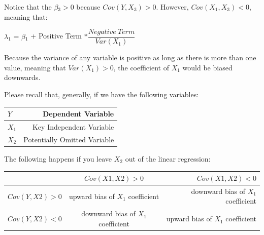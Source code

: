 \documentclass[12pt]{article}\usepackage[]{graphicx}\usepackage[]{color}
\begin{document}
\bigskip

Notice that the $\beta{_3} > 0$ because $Cov(Y, X_3) > 0$. However, $Cov(X_1, X_3) < 0$, meaning that:

\bigskip

$\lambda{_1}$ = $\beta{_1}$ + Positive Term $* \dfrac{Negative \ Term}{Var(X_1)}$

\bigskip

Because the variance of any variable is positive as long as there is more than one value, meaning that $Var(X_1) > 0$, the coefficient of $X_1$ would be biased downwards. 

\bigskip

Please recall that, generally, if we have the following variables:

\begin{center}
  \begin{tabular}{ | l | r | }
    \hline
    $Y$ & Dependent Variable \\ \hline
    $X_1$ & Key Independent Variable \\ \hline
    $X_2$ & Potentially Omitted Variable \\
    \hline
  \end{tabular}
\end{center}

\bigskip

The following happens if you leave $X_2$ out of the linear regression:

\bigskip

\begin{center}
    \begin{tabular}{ | l | c | r |}
    \hline
    & $Cov(X1,X2) > 0$ & $Cov(X1,X2) < 0$ \\ \hline
    $Cov(Y,X2) > 0$ & upward bias of $X_1$ coefficient & downward bias of $X_1$ coefficient \\ \hline
    $Cov(Y,X2) < 0$ & downward bias of $X_1$ coefficient & upward bias of $X_1$ coefficient \\
    \hline
    \end{tabular}
\end{center}
\end{document}
